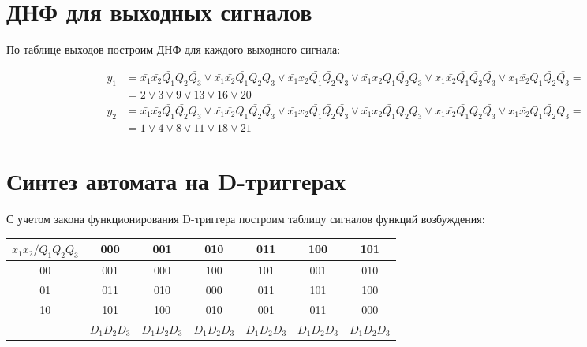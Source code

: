 \documentclass[listings]{labreport}
\begin{document}
\section*{ДНФ для выходных сигналов}

По таблице выходов построим ДНФ для каждого выходного сигнала:

\begin{align*}
y_1 & = \bar{x_1}\bar{x_2}\bar{Q_1}Q_2\bar{Q_3} \lor \bar{x_1}\bar{x_2}\bar{Q_1}Q_2Q_3 \lor \bar{x_1}x_2\bar{Q_1}\bar{Q_2}Q_3 \lor \bar{x_1}x_2Q_1\bar{Q_2}Q_3 \lor x_1\bar{x_2}\bar{Q_1}\bar{Q_2}\bar{Q_3} \lor x_1\bar{x_2}Q_1\bar{Q_2}\bar{Q_3} = \\ & = 2 \lor 3 \lor 9 \lor 13 \lor 16 \lor 20 \\
y_2 & = \bar{x_1}\bar{x_2}\bar{Q_1}\bar{Q_2}Q_3 \lor \bar{x_1}\bar{x_2}Q_1\bar{Q_2}\bar{Q_3} \lor \bar{x_1}x_2\bar{Q_1}\bar{Q_2}\bar{Q_3} \lor \bar{x_1}x_2\bar{Q_1}Q_2Q_3 \lor x_1\bar{x_2}\bar{Q_1}Q_2\bar{Q_3} \lor x_1\bar{x_2}Q_1\bar{Q_2}Q_3 = \\ & = 1 \lor 4 \lor 8 \lor 11 \lor 18 \lor 21
\end{align*}

\section*{Синтез автомата на D-триггерах}

С учетом закона функционирования D-триггера построим таблицу
сигналов функций возбуждения:

\begin{tabular}{|*{7}{c|}}
\hline
$x_1x_2/Q_1Q_2Q_3$ & 000 & 001 & 010 & 011 & 100 & 101\\\hline
00 & 001 & 000 & 100 & 101 & 001 & 010\\\hline
01 & 011 & 010 & 000 & 011 & 101 & 100\\\hline
10 & 101 & 100 & 010 & 001 & 011 & 000\\\hline
 & $D_1D_2D_3$ & $D_1D_2D_3$ & $D_1D_2D_3$ & $D_1D_2D_3$ & $D_1D_2D_3$ & $D_1D_2D_3$\\\hline
\end{tabular}
\end{document}
